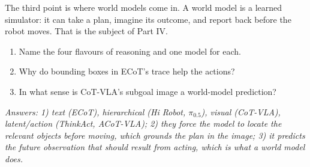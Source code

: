 The third point is where world models come in. A world model is a learned simulator: it can take a plan, imagine its outcome, and report back before the robot moves. That is the subject of Part IV.

\begin{quizbox}
\begin{enumerate}[leftmargin=*]
\item Name the four flavours of reasoning and one model for each.
\item Why do bounding boxes in ECoT's trace help the actions?
\item In what sense is CoT-VLA's subgoal image a world-model prediction?
\end{enumerate}
\emph{Answers: 1) text (ECoT), hierarchical (Hi Robot, $\pi_{0.5}$), visual (CoT-VLA), latent/action (ThinkAct, ACoT-VLA); 2) they force the model to locate the relevant objects before moving, which grounds the plan in the image; 3) it predicts the future observation that should result from acting, which is what a world model does.}
\end{quizbox}
